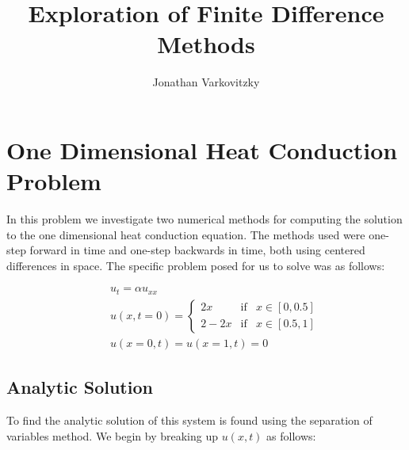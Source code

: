 \documentclass[a4paper,12pt,titlepage]{article}
\begin{document}
\title{Exploration of Finite Difference Methods}
\author{Jonathan Varkovitzky}
\maketitle

\pagestyle{plain} %
\tableofcontents

\newpage

\setcounter{page}{2}
\listoffigures

\newpage


\newpage



\section{One Dimensional Heat Conduction Problem}

In this problem we investigate two numerical methods for computing the solution to the one dimensional heat conduction equation.  The methods used were one-step forward in time and one-step backwards in time, both using centered differences in space.  The specific problem posed for us to solve was as follows:

\begin{eqnarray}
&& u_t = \alpha u _{xx}\nonumber \\
&&u(x,t=0) = \left\{\begin{array}{lll} 2x & \mbox{if} & x \in[0,0.5] \\ 2-2x & \mbox{if} & x \in[0.5,1]\end{array}  \right.\nonumber \\
&&u(x=0,t) = u(x=1,t) = 0
\label{heatStatement}
\end{eqnarray}

\subsection{Analytic Solution}

To find the analytic solution of this system is found using the separation of variables method.  We begin by breaking up $u(x,t)$ as follows:
\end{document}
